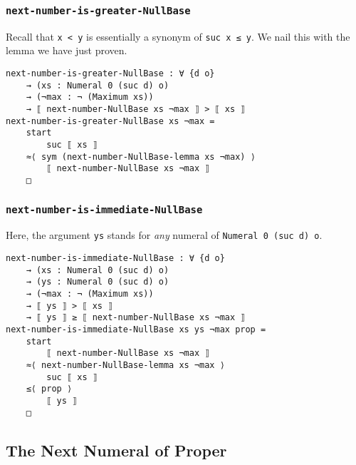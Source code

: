 \documentclass[\main/thesis.tex]{subfiles}
\begin{document}
\subsubsection{{\lstinline|next-number-is-greater-NullBase|}}

Recall that {\lstinline|x < y|} is essentially a synonym of {\lstinline|suc x ≤ y|}.
We nail this with the lemma we have just proven.

\begin{lstlisting}
next-number-is-greater-NullBase : ∀ {d o}
    → (xs : Numeral 0 (suc d) o)
    → (¬max : ¬ (Maximum xs))
    → ⟦ next-number-NullBase xs ¬max ⟧ > ⟦ xs ⟧
next-number-is-greater-NullBase xs ¬max =
    start
        suc ⟦ xs ⟧
    ≈⟨ sym (next-number-NullBase-lemma xs ¬max) ⟩
        ⟦ next-number-NullBase xs ¬max ⟧
    □
\end{lstlisting}

\subsubsection{{\lstinline|next-number-is-immediate-NullBase|}}

Here, the argument {\lstinline|ys|} stands for \textit{any} numeral of {\lstinline|Numeral 0 (suc d) o|}.

\begin{lstlisting}
next-number-is-immediate-NullBase : ∀ {d o}
    → (xs : Numeral 0 (suc d) o)
    → (ys : Numeral 0 (suc d) o)
    → (¬max : ¬ (Maximum xs))
    → ⟦ ys ⟧ > ⟦ xs ⟧
    → ⟦ ys ⟧ ≥ ⟦ next-number-NullBase xs ¬max ⟧
next-number-is-immediate-NullBase xs ys ¬max prop =
    start
        ⟦ next-number-NullBase xs ¬max ⟧
    ≈⟨ next-number-NullBase-lemma xs ¬max ⟩
        suc ⟦ xs ⟧
    ≤⟨ prop ⟩
        ⟦ ys ⟧
    □
\end{lstlisting}


\subsection{The Next Numeral of Proper}

%
\end{document}
